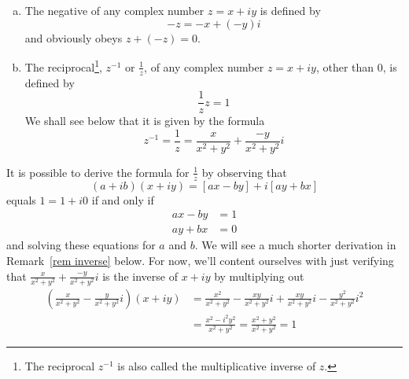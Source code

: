 \begin{defn}\label{def add mult inverse}
\begin{enumerate}[(a)]
\item
The negative of any complex number $z= x+iy$ is defined by 
\begin{equation*}
-z=-x+(-y)i
\end{equation*}
and obviously obeys $z+(-z)=0$.
\item
The reciprocal\footnote{The reciprocal $z^{-1}$ is also called the multiplicative inverse of $z$.}, $z^{-1}$ or $\frac{1}{z}$, of any complex 
number $z= x+iy$, other than $0$, is defined by 
\begin{equation*}
\frac{1}{z}z =1
\end{equation*}
We shall see below that it is given by the formula
 \begin{equation*}
z^{-1}=\frac{1}{z}=\frac{x}{x^2+y^2}+\frac{-y}{x^2+y^2}i
\end{equation*}
\end{enumerate}
\end{defn}
\begin{eg}\label{eg mult inverse}
It is possible to derive the formula for $\frac{1}{z}$ by observing that
\begin{equation*}
(a+ib)(x+iy)=[ax-by] + i[ay+bx]
\end{equation*} 
equals $1 = 1+i0$ if and only if
\begin{align*}
ax-by&=1 \\
ay+bx&=0
\end{align*}
and solving these equations for $a$ and $b$. We will see a much shorter 
derivation in Remark~\ref{rem inverse} below. For now, we'll content 
ourselves with just verifying that $\frac{x}{x^2+y^2}+\frac{-y}{x^2+y^2}i$ 
is the inverse of $x+iy$ by multiplying out
\begin{align*}
\left(\frac{x}{x^2+y^2}-\frac{y}{x^2+y^2}i\right)(x+iy)
&=\frac{x^2}{x^2+y^2}-\frac{xy}{x^2+y^2}i
+\frac{xy}{x^2+y^2}i-\frac{y^2}{x^2+y^2}i^2 \\
&=\frac{x^2-i^2y^2}{x^2+y^2}
=\frac{x^2+y^2}{x^2+y^2}=1
\end{align*}
\end{eg}

